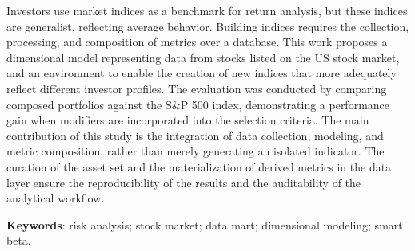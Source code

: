 \begin{resumo}[Abstract]
\begin{SingleSpace}
Investors use market indices as a benchmark for return analysis, but these indices are generalist, reflecting average behavior. Building indices requires the collection, processing, and composition of metrics over a database. This work proposes a dimensional model representing data from stocks listed on the US stock market, and an environment to enable the creation of new indices that more adequately reflect different investor profiles. The evaluation was conducted by comparing composed portfolios against the S\&P 500 index, demonstrating a performance gain when modifiers are incorporated into the selection criteria. The main contribution of this study is the integration of data collection, modeling, and metric composition, rather than merely generating an isolated indicator. The curation of the asset set and the materialization of derived metrics in the data layer ensure the reproducibility of the results and the auditability of the analytical workflow.
\end{SingleSpace}
\vspace{\onelineskip}
\textbf{Keywords}: risk analysis; stock market; data mart; dimensional modeling; smart beta.
\end{resumo}